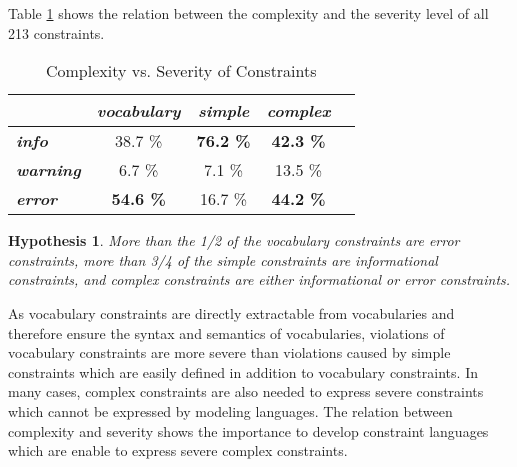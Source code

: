 \documentclass{llncs}
\newtheorem{hyp}{Hypothesis}
\begin{document}
{{%

Table \ref{tab:evaluation-complexity-severity} shows the relation between the complexity and the severity level of all 213 constraints.

\begin{table}[H]
		\scriptsize
    \begin{center}
    \begin{tabular}{@{}lcccc@{}}
    \\       \textbf{}
           & \textbf{\emph{vocabulary}}
           & \textbf{\emph{simple}}
					 & \textbf{\emph{complex}}
    \\ \midrule
		\textbf{\emph{info}} & 38.7 \% & \textbf{76.2 \%} & \textbf{42.3 \%} \\
		\textbf{\emph{warning}} & 6.7 \% & 7.1 \% & 13.5 \% \\
		\textbf{\emph{error}} & \textbf{54.6 \%} & 16.7 \% & \textbf{44.2 \%} \\
    \bottomrule
    \end{tabular}
    \caption{Complexity vs. Severity of Constraints}
		\label{tab:evaluation-complexity-severity}
    \end{center}
\end{table}

\begin{hyp}
More than the 1/2 of the vocabulary constraints are error constraints,
more than 3/4 of the simple constraints are informational constraints, and
complex constraints are either informational or error constraints. 
\end{hyp}

As vocabulary constraints are directly extractable from vocabularies and therefore ensure the syntax and semantics of vocabularies,
violations of vocabulary constraints are more severe than violations caused by simple constraints which are easily defined in addition to vocabulary constraints.
In many cases, complex constraints are also needed to express severe constraints which cannot be expressed by modeling languages.
The relation between complexity and severity shows the importance to develop constraint languages which are enable to express severe complex constraints. 

}}
\end{document}
